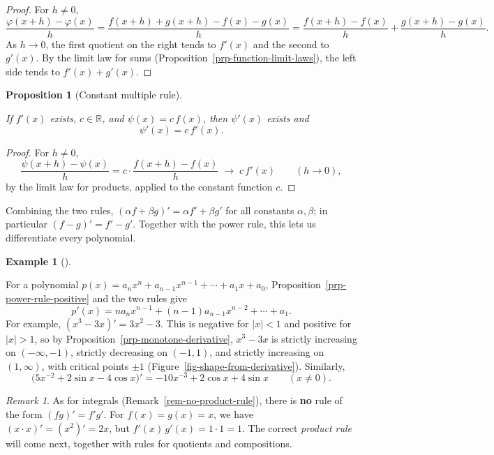 \documentclass[
  letterpaper,
  DIV=11,
  numbers=noendperiod]{scrreprt}
\theoremstyle{plain}
\theoremstyle{plain}
\newtheorem{proposition}{Proposition}[chapter]
\theoremstyle{definition}
\theoremstyle{definition}
\theoremstyle{definition}
\newtheorem{example}{Example}[chapter]
\theoremstyle{plain}
\theoremstyle{plain}
\theoremstyle{remark}
\newtheorem{refremark}{Remark}[chapter]
\begin{document}
\begin{proof}
For \(h\neq0\), \[
\frac{\varphi(x+h)-\varphi(x)}{h} = \frac{f(x+h)+g(x+h)-f(x)-g(x)}{h}
= \frac{f(x+h)-f(x)}{h} + \frac{g(x+h)-g(x)}{h}.
\] As \(h\to0\), the first quotient on the right tends to \(f'(x)\) and
the second to \(g'(x)\). By the limit law for sums
(Proposition~\ref{prp-function-limit-laws}), the left side tends to
\(f'(x)+g'(x)\).
\end{proof}

\begin{proposition}[Constant multiple
rule]\protect\hypertarget{prp-derivative-constant-multiple}{}\label{prp-derivative-constant-multiple}

If \(f'(x)\) exists, \(c\in\mathbb{R}\), and \(\psi(x) = c\,f(x)\), then
\(\psi'(x)\) exists and \[
\psi'(x) = c\,f'(x).
\]

\end{proposition}

\begin{proof}
For \(h\neq0\), \[
\frac{\psi(x+h)-\psi(x)}{h} = c\cdot\frac{f(x+h)-f(x)}{h} \;\longrightarrow\; c\,f'(x)
\qquad(h\to 0),
\] by the limit law for products, applied to the constant function
\(c\).
\end{proof}

Combining the two rules, \((\alpha f+\beta g)' = \alpha f'+\beta g'\)
for all constants \(\alpha,\beta\); in particular \((f-g)' = f'-g'\).
Together with the power rule, this lets us differentiate every
polynomial.

\begin{example}[]\protect\hypertarget{exm-polynomial-derivative}{}\label{exm-polynomial-derivative}

\hfill\break
For a polynomial
\(p(x) = a_nx^n + a_{n-1}x^{n-1} + \cdots + a_1x + a_0\),
Proposition~\ref{prp-power-rule-positive} and the two rules give \[
p'(x) = n a_n x^{n-1} + (n-1)a_{n-1}x^{n-2} + \cdots + a_1 .
\] For example, \((x^3-3x)' = 3x^2-3\). This is negative for
\(\lvert x \rvert<1\) and positive for \(\lvert x \rvert>1\), so by
Proposition~\ref{prp-monotone-derivative}, \(x^3-3x\) is strictly
increasing on \((-\infty,-1)\), strictly decreasing on \((-1,1)\), and
strictly increasing on \((1,\infty)\), with critical points \(\pm1\)
(Figure~\ref{fig-shape-from-derivative}). Similarly, \[
\big(5x^{-2} + 2\sin x - 4\cos x\big)' = -10x^{-3} + 2\cos x + 4\sin x \qquad (x\neq0).
\]

\end{example}

\begin{refremark}
As for integrals (Remark~\ref{rem-no-product-rule}), there is
\textbf{no} rule of the form \((fg)' = f'g'\). For \(f(x)=g(x)=x\), we
have \((x\cdot x)' = (x^2)' = 2x\), but \(f'(x)\,g'(x) = 1\cdot1=1\).
The correct \emph{product rule} will come next, together with rules for
quotients and compositions.

\label{rem-no-product-rule-derivative}

\end{refremark}
\end{document}
